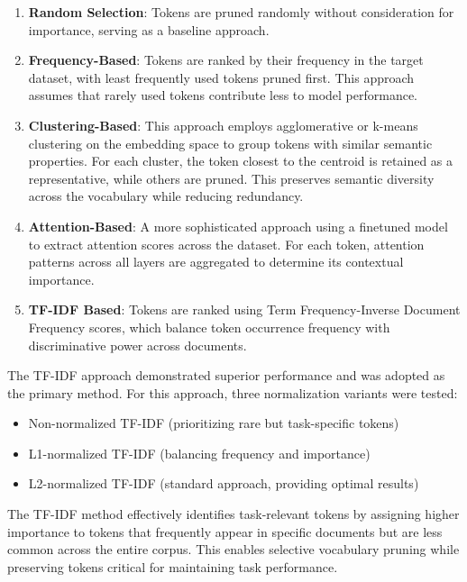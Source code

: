 \documentclass[twocolumn]{article}
\begin{document}
\begin{enumerate}
    \item \textbf{Random Selection}: Tokens are pruned randomly without consideration for importance, serving as a baseline approach.
    
    \item \textbf{Frequency-Based}: Tokens are ranked by their frequency in the target dataset, with least frequently used tokens pruned first. This approach assumes that rarely used tokens contribute less to model performance.
    
    \item \textbf{Clustering-Based}: This approach employs agglomerative or k-means clustering on the embedding space to group tokens with similar semantic properties. For each cluster, the token closest to the centroid is retained as a representative, while others are pruned. This preserves semantic diversity across the vocabulary while reducing redundancy.
    
    \item \textbf{Attention-Based}: A more sophisticated approach using a finetuned model to extract attention scores across the dataset. For each token, attention patterns across all layers are aggregated to determine its contextual importance.
    
    \item \textbf{TF-IDF Based}: Tokens are ranked using Term Frequency-Inverse Document Frequency scores, which balance token occurrence frequency with discriminative power across documents.
\end{enumerate}

The TF-IDF approach demonstrated superior performance and was adopted as the primary method. For this approach, three normalization variants were tested:
\begin{itemize}
    \item Non-normalized TF-IDF (prioritizing rare but task-specific tokens)
    \item L1-normalized TF-IDF (balancing frequency and importance)
    \item L2-normalized TF-IDF (standard approach, providing optimal results)
\end{itemize}

The TF-IDF method effectively identifies task-relevant tokens by assigning higher importance to tokens that frequently appear in specific documents but are less common across the entire corpus. This enables selective vocabulary pruning while preserving tokens critical for maintaining task performance.
\end{document}
